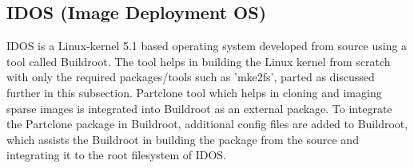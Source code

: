 \documentclass[a4paper,12pt]{article}
\begin{document}
\subsection{ IDOS (Image Deployment OS) }
IDOS is a Linux-kernel 5.1 based operating system developed from source using a tool called  Buildroot\cite{buildroot}. The tool helps in building the Linux kernel from scratch with only the required packages/tools such as 'mke2fs', parted as discussed further in this subsection. Partclone tool which helps in cloning and imaging sparse images is integrated into Buildroot as an external package. To integrate the Partclone package in Buildroot, additional config files are added to Buildroot, which assists the Buildroot in building the package from the source and integrating it to the root filesystem of IDOS.
\end{document}
